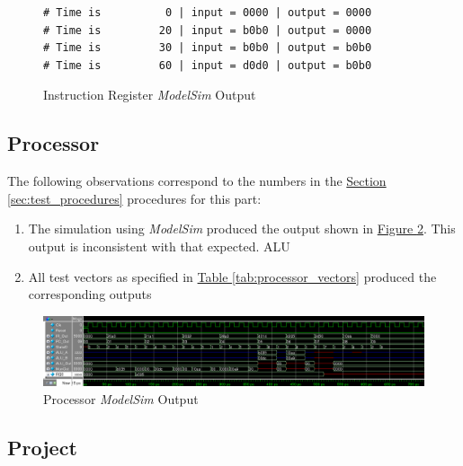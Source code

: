 \begin{figure}[htbp]
    \begin{lstlisting}[numbers=none, basicstyle = \ttfamily\scriptsize]
# Time is          0 | input = 0000 | output = 0000
# Time is         20 | input = b0b0 | output = 0000
# Time is         30 | input = b0b0 | output = b0b0
# Time is         60 | input = d0d0 | output = b0b0
    \end{lstlisting}
    \caption{Instruction Register \emph{ModelSim} Output\label{fig:ir_output}}
\end{figure}


\subsection{Processor} %
\label{sub:processor}

The following observations correspond to the numbers in the \hyperref[sec:test_procedures]{Section \ref*{sec:test_procedures}} procedures for this part:

\begin{enumerate}
    \item The simulation using \emph{ModelSim} produced the output shown in \hyperref[fig:processor_output]{Figure \ref*{fig:processor_output}}.
    This output is inconsistent with that expected.
    ALU
    \item All test vectors as specified in \hyperref[tab:processor_vectors]{Table \ref*{tab:processor_vectors}} produced the corresponding outputs
\end{enumerate}

\begin{figure}
    \includegraphics[width=\textwidth]{images/wave.png}
    \caption{Processor \emph{ModelSim} Output\label{fig:processor_output}}
\end{figure}


\subsection{Project} %
\label{sub:projects}

